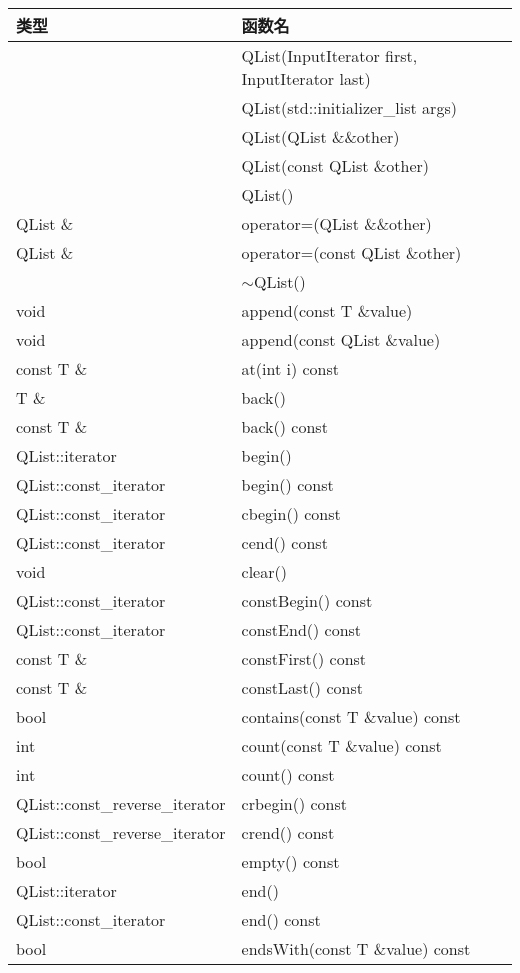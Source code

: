 \begin{longtable}{|l|m{25em}|}
\hline
 类型& 	函数名\\
\hline
 &	QList(InputIterator first, InputIterator last)\\
\hline
&	QList(std::initializer\_list args)\\
\hline
&	QList(QList \&\&other)\\
\hline
&	QList(const QList \&other)\\
\hline
&	QList()\\
\hline
QList \&& 	operator=(QList \&\&other)\\
\hline
QList \& &	operator=(const QList \&other)\\
\hline
	& $\sim$QList()\\
\hline
void &	append(const T \&value)\\
\hline
void &	append(const QList \&value)\\
\hline
const T \& & 	at(int i) const\\
\hline
T \& &	back()\\
\hline
const T \& &	back() const\\
\hline
QList::iterator &	begin()\\
\hline
QList::const\_iterator& 	begin() const\\
\hline
QList::const\_iterator& 	cbegin() const\\
\hline
QList::const\_iterator& 	cend() const\\
\hline
void &	clear()\\
\hline
QList::const\_iterator & 	constBegin() const\\
\hline
QList::const\_iterator &	constEnd() const\\
\hline
const T \& &	constFirst() const\\
\hline
const T \& &	constLast() const\\
\hline
bool& 	contains(const T \&value) const\\
\hline
int& 	count(const T \&value) const\\
\hline
int& 	count() const\\
\hline
QList::const\_reverse\_iterator &	crbegin() const\\
\hline
QList::const\_reverse\_iterator &	crend() const\\
\hline
bool 	& empty() const\\
\hline
QList::iterator& 	end()\\
\hline
QList::const\_iterator &	end() const\\
\hline
bool &	endsWith(const T \&value) const\\

\end{longtable}
